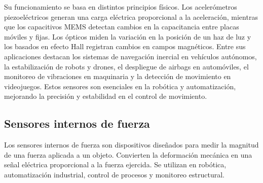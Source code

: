 Su funcionamiento se basa en distintos principios físicos. Los acelerómetros piezoeléctricos generan una carga eléctrica proporcional a la aceleración, mientras que los capacitivos MEMS detectan cambios en la capacitancia entre placas móviles y fijas. Los ópticos miden la variación en la posición de un haz de luz y los basados en efecto Hall registran cambios en campos magnéticos.
Entre sus aplicaciones destacan los sistemas de navegación inercial en vehículos autónomos, la estabilización de robots y drones, el despliegue de airbags en automóviles, el monitoreo de vibraciones en maquinaria y la detección de movimiento en videojuegos. Estos sensores son esenciales en la robótica y automatización, mejorando la precisión y estabilidad en el control de movimiento.

\subsection{Sensores internos de fuerza}
Los sensores internos de fuerza son dispositivos diseñados para medir la magnitud de una fuerza aplicada a un objeto. Convierten la deformación mecánica en una señal eléctrica proporcional a la fuerza ejercida. Se utilizan en robótica, automatización industrial, control de procesos y monitoreo estructural.
